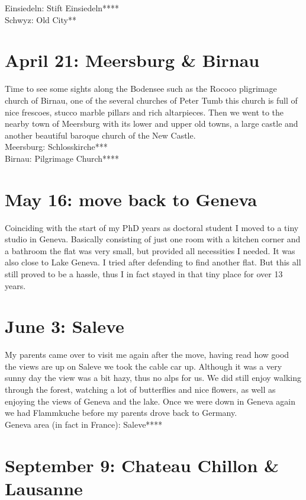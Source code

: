 Einsiedeln: Stift Einsiedeln****\\
Schwyz: Old City**

\section{April 21: Meersburg \& Birnau}
\label{2007:Meersburg}

Time to see some sights along the Bodensee such as the Rococo pligrimage church of Birnau, one of the several churches of Peter Tumb this church is full of nice frescoes, stucco marble pillars and rich altarpieces. Then we went to the nearby town of Meersburg with its lower and upper old towns, a large castle and another beautiful baroque church of the New Castle.\\

Meersburg: Schlosskirche***\\
Birnau: Pilgrimage Church****

\section{May 16: move back to Geneva}
\label{moveGeneva}

Coinciding with the start of my PhD years as doctoral student I moved to a tiny studio in Geneva. Basically consisting of just one room with a kitchen corner and a bathroom the flat was very small, but provided all necessities I needed. It was also close to Lake Geneva. I tried after defending to find another flat. But this all still proved to be a hassle, thus I in fact stayed in that tiny place for over 13 years.

\section{June 3: Saleve}
\label{2007:Saleve}

My parents came over to visit me again after the move, having read how good the views are up on Saleve we took the cable car up. Although it was a very sunny day the view was a bit hazy, thus no alps for us. We did still enjoy walking through the forest, watching a lot of butterflies and nice flowers, as well as enjoying the views of Geneva and the lake. Once we were down in Geneva again we had Flammkuche before my parents drove back to Germany.\\

Geneva area (in fact in France): Saleve****

\section{September 9: Chateau Chillon \& Lausanne}
\label{2007:Chillon}

